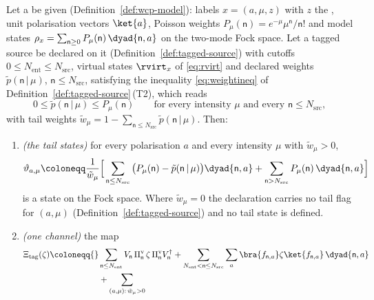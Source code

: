 \begin{proposition}\label{prop:tagging}
Let a  be given
(Definition~\ref{def:wcp-model}): labels $x=(a,\mu,z)$ with $z$ the
, unit polarisation vectors
$\ket{a}$, Poisson weights
$P_\mu(\mathsf{n})=e^{-\mu}\mu^{\mathsf{n}}/\mathsf{n}!$ and model states
$\rho_x=\sum_{\mathsf{n}\ge0}P_\mu(\mathsf{n})\,\dyad{\mathsf{n},a}$ on the
two-mode Fock space. Let a tagged source be declared on it
(Definition~\ref{def:tagged-source}) with cutoffs
$0\le N_{\mathrm{ent}}\le N_{\mathrm{src}}$, virtual states $\rvirt_x$ of
\eqref{eq:rvirt} and declared weights $\tilde p(\mathsf{n}\,|\,\mu)$,
$\mathsf{n}\le N_{\mathrm{src}}$, satisfying the inequality
\eqref{eq:weightineq} of Definition~\ref{def:tagged-source}\,(T2), which
reads
\begin{equation}\label{eq:tag-ineq}
  0\le\tilde p(\mathsf{n}\,|\,\mu)\le P_\mu(\mathsf{n})
  \qquad\text{for every intensity }\mu\text{ and every }
  \mathsf{n}\le N_{\mathrm{src}} ,
\end{equation}
with tail weights
$\tilde w_\mu=1-\sum_{\mathsf{n}\le N_{\mathrm{src}}}\tilde p(\mathsf{n}\,|\,\mu)$.
Then:
\begin{enumerate}[label=(\roman*),leftmargin=2.2em]
\item \emph{(the tail states)} for every polarisation $a$ and every intensity
$\mu$ with $\tilde w_\mu>0$,
\begin{equation}\label{eq:tailstate}
  \vartheta_{a,\mu}\coloneqq\frac{1}{\tilde w_\mu}\Big[
  \sum_{\mathsf{n}\le N_{\mathrm{src}}}
  \big(P_\mu(\mathsf{n})-\tilde p(\mathsf{n}\,|\,\mu)\big)\dyad{\mathsf{n},a}
  +\sum_{\mathsf{n}>N_{\mathrm{src}}}P_\mu(\mathsf{n})\,\dyad{\mathsf{n},a}
  \Big]
\end{equation}
is a state on the Fock space. Where $\tilde w_\mu=0$ the declaration carries no
tail flag for $(a,\mu)$ (Definition~\ref{def:tagged-source}) and no tail state
is defined.
\item \emph{(one channel)} the map
\begin{equation}\label{eq:xitag}
\begin{aligned}
  \Xi_{\mathrm{tag}}(\zeta)\coloneqq{}&
  \sum_{\mathsf{n}\le N_{\mathrm{ent}}}
    V_{\mathsf{n}}\,\Pi^{\mathrm v}_{\mathsf{n}}\,\zeta\,
    \Pi^{\mathrm v}_{\mathsf{n}}V_{\mathsf{n}}^{\dagger}
  +\sum_{N_{\mathrm{ent}}<\mathsf{n}\le N_{\mathrm{src}}}\sum_{a}
    \bra{f_{\mathsf{n},a}}\zeta\ket{f_{\mathsf{n},a}}\,\dyad{\mathsf{n},a}\\
  &+\sum_{(a,\mu):\,\tilde w_\mu>0}

\end{aligned}
\end{equation}
\end{enumerate}
\end{proposition}
